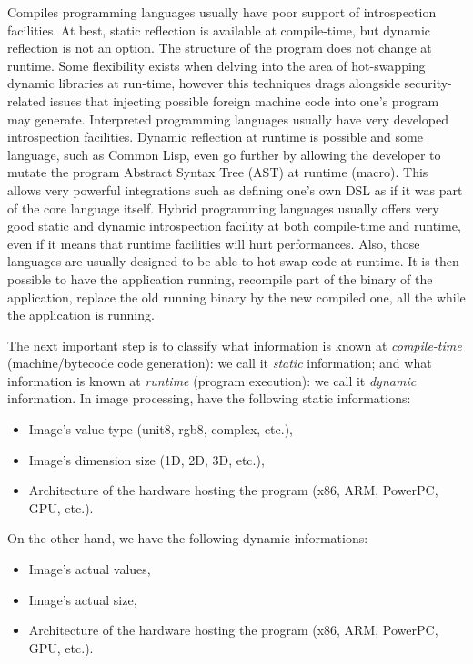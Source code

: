 Compiles programming languages usually have poor support of introspection facilities. At best, static reflection is
available at compile-time, but dynamic reflection is not an option. The structure of the program does not change at
runtime. Some flexibility exists when delving into the area of hot-swapping dynamic libraries at run-time, however this
techniques drags alongside security-related issues that injecting possible foreign machine code into one's program may
generate.
Interpreted programming languages usually have very developed introspection facilities. Dynamic reflection at
runtime is possible and some language, such as Common Lisp, even go further by allowing the developer to mutate the
program Abstract Syntax Tree (AST) at runtime (macro). This allows very powerful integrations such as defining one's own
DSL as if it was part of the core language itself.
Hybrid programming languages usually offers very good static and dynamic introspection facility at both compile-time and
runtime, even if it means that runtime facilities will hurt performances. Also, those languages are usually designed to
be able to hot-swap code at runtime. It is then possible to have the application running, recompile part of the binary
of the application, replace the old running binary by the new compiled one, all the while the application is running.

The next important step is to classify what information is known at \emph{compile-time} (machine/bytecode code
generation): we call it \emph{static} information; and what information is known at \emph{runtime} (program execution):
we call it \emph{dynamic} information. In image processing, have the following static informations:
\begin{itemize}
  \item Image's value type (unit8, rgb8, complex, etc.),
  \item Image's dimension size (1D, 2D, 3D, etc.),
  \item Architecture of the hardware hosting the program (x86, ARM, PowerPC, GPU, etc.).
\end{itemize}

On the other hand, we have the following dynamic informations:
\begin{itemize}
  \item Image's actual values,
  \item Image's actual size,
  \item Architecture of the hardware hosting the program (x86, ARM, PowerPC, GPU, etc.).
\end{itemize}

